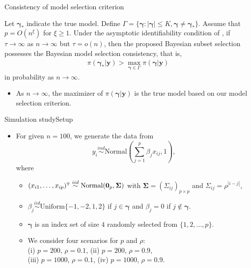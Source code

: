 \documentclass[citecolor=blue,10pt]{beamer}
\def\bg{{\boldsymbol \gamma}}
\def\T{{ \mathrm{\scriptscriptstyle T} }}
\def\uSigma{{\boldsymbol \Sigma}}
\newcommand{\0} {\mbox{\boldmath$0$}}
\newcommand{\uy}{{\boldsymbol y}}
\begin{document}
\begin{frame}{Consistency of model selection criterion}
\begin{theorem}\label{thm:2} Let $\bg_*$ indicate the true model. Define $\Gamma=\{\bg:|\bg|\leq K,\bg\neq \bg_*\}$. Assume that $p=O(n^\xi)$ for $\xi\geq 1$. Under the asymptotic identifiability condition of \citet{chen2008extended}, if $\tau\to \infty$ as $n\to \infty$ but $\tau=o(n)$, then the proposed Bayesian subset selection possesses the Bayesian model selection consistency, that is,
\begin{eqnarray}\label{thm:2:eq}
\pi(\bg_*|\uy) > \max_{ \bg \in \Gamma }\pi(\bg|\uy)
\end{eqnarray}
in probability as $n\to \infty$.
\end{theorem}
\begin{itemize}
  \item As $n\to \infty$, the maximizer of $\pi(\bg|\uy)$ is the true model based on our model selection criterion.
\end{itemize}
\end{frame}
\begin{frame}{Simulation study}{Setup}
\begin{itemize}\itemsep=3mm
\item For given $n=100$, we generate the data from 
$$y_i\overset{ind}{\sim}\text{Normal}\left(\sum_{j=1}^p \beta_j x_{ij},1\right),$$
where 
\begin{itemize}\itemsep=3mm
\item $(x_{i1},\ldots,x_{ip})^\T \overset{iid}{\sim}\text{Normal}(\0_p,\uSigma)$ with $\uSigma=(\Sigma_{ij})_{p\times p}$ and $\Sigma_{ij}=\rho^{|i-j|}$,
\item $\beta_j \overset{iid}{\sim} \text{Uniform}\{-1,-2,1,2\}$ if $j\in \bg$ and $\beta_j=0$ if $j\notin \bg$. 
\item $\bg$ is an index set of size $4$ randomly selected from $\{1,2,\ldots,p\}$.
\item We consider four scenarios for $p$ and $\rho$: \\
(i) $p=200$, $\rho=0.1$, (ii) $p=200$, $\rho=0.9$,\\
 (iii) $p=1000$, $\rho=0.1$, (iv) $p=1000$, $\rho=0.9$. 
\end{itemize}
\end{itemize}
\end{frame}
\end{document}
